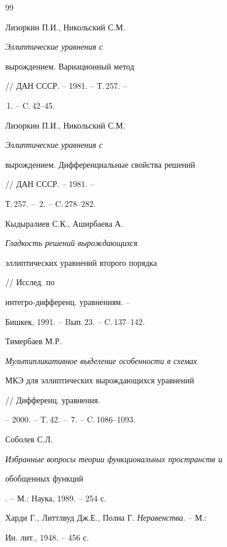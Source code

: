 \begin{thebibliography}{99}







Лизоркин П.И., Никольский С.М. {\em Эллиптические уравнения с


вырождением. Вариационный метод} // ДАН СССР. -- 1981. -- Т.\,257. --


\No\,1. -- C.\,42--45.







Лизоркин П.И., Никольский С.М. {\em Эллиптические уравнения с


вырождением. Дифференциальные свойства решений} // ДАН СССР. -- 1981. --


Т.\,257. -- \No\,2. -- C.\,278--282.







Кыдыралиев С.К., Аширбаева А. {\em Гладкость решений вырождающихся


эллиптических уравнений второго порядка} // Исслед. по


интегро-дифференц. уравнениям. --


Бишкек, 1991. -- Bып.\,23. -- C.\,137--142.







Тимербаев М.Р. {\em Мультипликативное выделение особенности в схемах


МКЭ для эллиптических вырождающихся уравнений} // Дифференц. уравнения.


-- 2000. -- T.\,42. -- \No\,7. -- C.\,1086--1093.







Соболев С.Л. {\em Избранные вопросы теории функциональных пространств и


обобщенных функций}. -- М.: Наука, 1989. -- 254 с.







Харди Г., Литтлвуд Дж.Е., Полиа Г. {\em Неравенства}. -- М.:


Ин. лит., 1948. -- 456 с.






\end{thebibliography}
